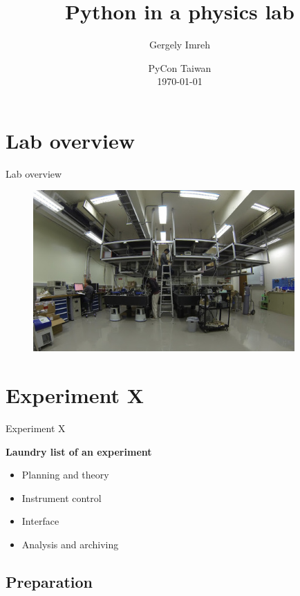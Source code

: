 \documentclass{beamer}
\title{Python in a physics lab}
\author{Gergely Imreh}
\date{PyCon Taiwan \\ \today}
\begin{document}
\maketitle

\section{Lab overview}

\begin{frame}{Lab overview}

\begin{figure}[ht]
	\includegraphics[width=10cm]{Labcrop500o.jpg}
\end{figure}


\end{frame}

\section{Experiment X}

\begin{frame}{Experiment X}

 \textbf{Laundry list of an experiment}
 
 \begin{itemize}
  \item Planning and theory
  \item Instrument control
  \item Interface
  \item Analysis and archiving
 \end{itemize}

\end{frame}

\subsection{Preparation}
\end{document}
